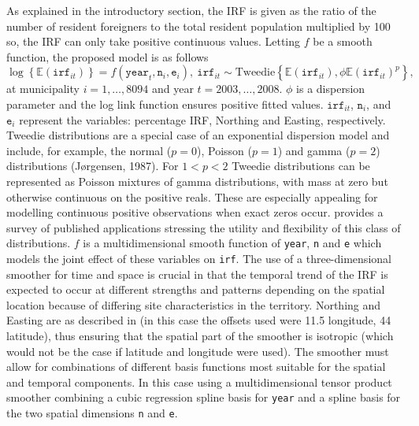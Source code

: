 As explained in the introductory section, the IRF is given as the ratio of the number of resident foreigners to the total resident population multiplied by 100 so, the IRF can only take positive continuous values. Letting $f$ be a smooth function, the proposed model is as follows
\begin{equation}
\log \left\{\mathbb{E}(\texttt{irf}_{it})\right\} = f(\texttt{year}_t,\texttt{n}_i,\texttt{e}_i), \ \texttt{irf}_{it} \sim \text{Tweedie}\left\{\mathbb{E}(\texttt{irf}_{it}),\phi \mathbb{E}(\texttt{irf}_{it})^{p}\right\},          
\label{PropM}
\end{equation}
at municipality $i=1,\ldots,8094$ and year $t=2003,\ldots,2008$. $\phi$ is a dispersion parameter and the log link function ensures positive fitted values. $\texttt{irf}_{it}$, $\texttt{n}_i$, and $\texttt{e}_i$ represent the variables: percentage IRF, Northing and Easting, respectively. Tweedie distributions are a special case of an exponential dispersion model and include, for example, the normal ($p=0$), Poisson ($p=1$) and gamma ($p=2$) distributions (J\o rgensen, 1987). For $1<p<2$ Tweedie distributions can be represented as Poisson mixtures of gamma distributions, with mass at zero but otherwise continuous on the positive reals. These are especially appealing for modelling continuous positive observations when exact zeros occur.  provides a survey of published applications stressing the utility and flexibility of this class of distributions. $f$ is a multidimensional smooth function of \texttt{year}, \texttt{n} and \texttt{e} which models the joint effect of these variables on \texttt{irf}. The use of a three-dimensional smoother for time and space is crucial in that the temporal trend of the IRF is expected to occur at different strengths and patterns depending on the spatial location because of differing site characteristics in the territory. Northing and Easting are as described in  (in this case the offsets used were 11.5 longitude, 44 latitude), thus ensuring that the spatial part of the smoother is isotropic (which would not be the case if latitude and longitude were used). The smoother must allow for combinations of different basis functions most suitable for the spatial and temporal components. In this case using a multidimensional tensor product smoother combining a cubic regression spline basis for \texttt{year} and a spline basis for the two spatial dimensions \texttt{n} and \texttt{e}. 

